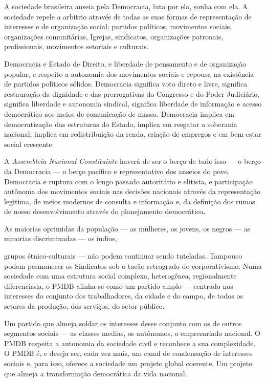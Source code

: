 A sociedade brasileira anseia pela Democracia, luta por ela, sonha com
ela. A sociedade repele a arbítrio através de todas as suas formas de
representação de interesses e de organização social: partidos políticos,
movimentos sociais, organizações comunitárias, Igrejas, sindicatos,
organizações patronais, profissionais, movimentos setoriais e culturais.

Democracia e Estado de Direito, e liberdade de pensamento e de
organização popular, e respeito a autonomia dos movimentos sociais e
repousa na existência de partidos políticos sólidos. Democracia
significa voto direto e livre, significa restauração da dignidade e das
prerrogativas do Congresso e do Poder Judiciário, significa liberdade e
autonomia sindical, significa liberdade de informação e acesso
democrático aos meios de comunicação de massa. Democracia implica em
democratização das estruturas do Estado, implica em resgatar a soberania
nacional, implica em redistribuição da renda, criação de empregos e em
bem-estar social crescente.

A \emph{Assembleia Nacional Constituinte} haverá de ser o berço de tudo
isso --- o berço da Democracia --- o berço pacifico e representativo dos
anseios do povo. Democracia e ruptura com o longo passado autoritário e
elitista, e participação autônoma dos movimentos sociais nas decisões
nacionais através da representação legitima, de meios modernos de
consulta e informação e, da definição dos rumos de nosso desenvolvimento
através do planejamento democrático\textbf{. }

As maiorias oprimidas da população --- as mulheres, os jovens, os negros
--- as minorias discriminadas --- os índios,

grupos étnico-culturais --- não podem continuar sendo tuteladas.
Tampouco podem permanecer os Sindicatos sob o tacão retrogrado do
corporativismo. Numa sociedade com uma estrutura social complexa,
heterogênea, regionalmente diferenciada, o PMDB alinha-se como um
partido amplo --- centrado nos interesses do conjunto dos trabalhadores,
da cidade e do campo, de todos os setores da produção, dos serviços, do
setor público.

Um partido que almeja soldar os interesses desse conjunto com os de
outros segmentos sociais --- as classes medias, os autônomos, o
empresariado nacional. O PMDB respeita a autonomia da sociedade civil e
reconhece a sua complexidade. O PMDB é, e deseja ser, cada vez mais, um
canal de condensação de interesses sociais e, para isso, oferece a
sociedade um projeto global coerente. Um projeto que almeja a
transformação democrática da vida nacional.

